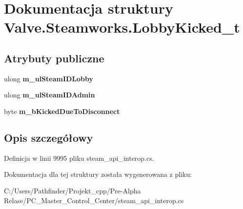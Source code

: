 \hypertarget{struct_valve_1_1_steamworks_1_1_lobby_kicked__t}{}\section{Dokumentacja struktury Valve.\+Steamworks.\+Lobby\+Kicked\+\_\+t}
\label{struct_valve_1_1_steamworks_1_1_lobby_kicked__t}
\subsection*{Atrybuty publiczne}
\begin{DoxyCompactItemize}
\item 
\mbox{\label{struct_valve_1_1_steamworks_1_1_lobby_kicked__t_aeccbe3b86432b4e87b140a2f83aefedb}} 
ulong {\bfseries m\+\_\+ul\+Steam\+I\+D\+Lobby}
\item 
\mbox{\label{struct_valve_1_1_steamworks_1_1_lobby_kicked__t_a8e2d3ffcc0ea790af43da93f8f468f4d}} 
ulong {\bfseries m\+\_\+ul\+Steam\+I\+D\+Admin}
\item 
\mbox{\label{struct_valve_1_1_steamworks_1_1_lobby_kicked__t_abc6b6b2efec2502caf943e729e6a6a09}} 
byte {\bfseries m\+\_\+b\+Kicked\+Due\+To\+Disconnect}
\end{DoxyCompactItemize}


\subsection{Opis szczegółowy}


Definicja w linii 9995 pliku steam\+\_\+api\+\_\+interop.\+cs.



Dokumentacja dla tej struktury została wygenerowana z pliku\+:\begin{DoxyCompactItemize}
\item 
C\+:/\+Users/\+Pathfinder/\+Projekt\+\_\+cpp/\+Pre-\/\+Alpha Relase/\+P\+C\+\_\+\+Master\+\_\+\+Control\+\_\+\+Center/steam\+\_\+api\+\_\+interop.\+cs\end{DoxyCompactItemize}
